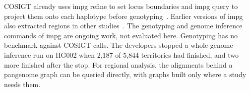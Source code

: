 COSIGT already uses impg refine to set locus boundaries and impg query to project them onto each haplotype before genotyping~\citep{Bolognini2026cosigt}.
Earlier versions of impg also extracted regions in other studies~\citep{Varki2025rindex,Sorin2025cattle,Sorin2026kit}.
The genotyping and genome inference commands of impg are ongoing work, not evaluated here.
Genotyping has no benchmark against COSIGT calls.
The developers stopped a whole-genome inference run on HG002 when 2,187 of 5,844 territories had finished, and two more finished after the stop.
For regional analysis, the alignments behind a pangenome graph can be queried directly, with graphs built only where a study needs them.
